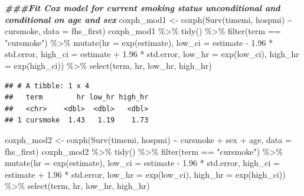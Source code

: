 \documentclass[
]{book}
\newenvironment{Shaded}{\begin{snugshade}}{\end{snugshade}}
\newcommand{\AttributeTok}[1]{\textcolor[rgb]{0.77,0.63,0.00}{#1}}
\newcommand{\DocumentationTok}[1]{\textcolor[rgb]{0.56,0.35,0.01}{\textbf{\textit{#1}}}}
\newcommand{\FloatTok}[1]{\textcolor[rgb]{0.00,0.00,0.81}{#1}}
\newcommand{\FunctionTok}[1]{\textcolor[rgb]{0.00,0.00,0.00}{#1}}
\newcommand{\NormalTok}[1]{#1}
\newcommand{\OtherTok}[1]{\textcolor[rgb]{0.56,0.35,0.01}{#1}}
\newcommand{\SpecialCharTok}[1]{\textcolor[rgb]{0.00,0.00,0.00}{#1}}
\newcommand{\StringTok}[1]{\textcolor[rgb]{0.31,0.60,0.02}{#1}}
\begin{document}
\begin{Shaded}
\begin{Highlighting}[]
\DocumentationTok{\#\#\#Fit Cox model for current smoking status unconditional and conditional on age and sex}
\NormalTok{coxph\_mod1 }\OtherTok{\textless{}{-}} \FunctionTok{coxph}\NormalTok{(}\FunctionTok{Surv}\NormalTok{(timemi, hospmi) }\SpecialCharTok{\textasciitilde{}}\NormalTok{ cursmoke, }
                    \AttributeTok{data =}\NormalTok{ fhs\_first)}
\NormalTok{coxph\_mod1 }\SpecialCharTok{\%\textgreater{}\%} 
  \FunctionTok{tidy}\NormalTok{() }\SpecialCharTok{\%\textgreater{}\%} 
  \FunctionTok{filter}\NormalTok{(term }\SpecialCharTok{==} \StringTok{"cursmoke"}\NormalTok{) }\SpecialCharTok{\%\textgreater{}\%} 
  \FunctionTok{mutate}\NormalTok{(}\AttributeTok{hr =} \FunctionTok{exp}\NormalTok{(estimate),}
         \AttributeTok{low\_ci =}\NormalTok{ estimate }\SpecialCharTok{{-}} \FloatTok{1.96} \SpecialCharTok{*}\NormalTok{ std.error, }
         \AttributeTok{high\_ci =}\NormalTok{ estimate }\SpecialCharTok{+} \FloatTok{1.96} \SpecialCharTok{*}\NormalTok{ std.error, }
         \AttributeTok{low\_hr =} \FunctionTok{exp}\NormalTok{(low\_ci), }
         \AttributeTok{high\_hr =} \FunctionTok{exp}\NormalTok{(high\_ci)) }\SpecialCharTok{\%\textgreater{}\%} 
  \FunctionTok{select}\NormalTok{(term, hr, low\_hr, high\_hr)}
\end{Highlighting}
\end{Shaded}

\begin{verbatim}
## # A tibble: 1 x 4
##   term        hr low_hr high_hr
##   <chr>    <dbl>  <dbl>   <dbl>
## 1 cursmoke  1.43   1.19    1.73
\end{verbatim}

\begin{Shaded}
\begin{Highlighting}[]
\NormalTok{coxph\_mod2 }\OtherTok{\textless{}{-}} \FunctionTok{coxph}\NormalTok{(}\FunctionTok{Surv}\NormalTok{(timemi, hospmi) }\SpecialCharTok{\textasciitilde{}}\NormalTok{ cursmoke }\SpecialCharTok{+}\NormalTok{ sex }\SpecialCharTok{+}\NormalTok{ age, }
                    \AttributeTok{data =}\NormalTok{ fhs\_first)}
\NormalTok{coxph\_mod2 }\SpecialCharTok{\%\textgreater{}\%} 
  \FunctionTok{tidy}\NormalTok{() }\SpecialCharTok{\%\textgreater{}\%} 
  \FunctionTok{filter}\NormalTok{(term }\SpecialCharTok{==} \StringTok{"cursmoke"}\NormalTok{) }\SpecialCharTok{\%\textgreater{}\%} 
  \FunctionTok{mutate}\NormalTok{(}\AttributeTok{hr =} \FunctionTok{exp}\NormalTok{(estimate),}
         \AttributeTok{low\_ci =}\NormalTok{ estimate }\SpecialCharTok{{-}} \FloatTok{1.96} \SpecialCharTok{*}\NormalTok{ std.error, }
         \AttributeTok{high\_ci =}\NormalTok{ estimate }\SpecialCharTok{+} \FloatTok{1.96} \SpecialCharTok{*}\NormalTok{ std.error, }
         \AttributeTok{low\_hr =} \FunctionTok{exp}\NormalTok{(low\_ci), }
         \AttributeTok{high\_hr =} \FunctionTok{exp}\NormalTok{(high\_ci)) }\SpecialCharTok{\%\textgreater{}\%} 
  \FunctionTok{select}\NormalTok{(term, hr, low\_hr, high\_hr)}
\end{Highlighting}
\end{Shaded}
\end{document}
